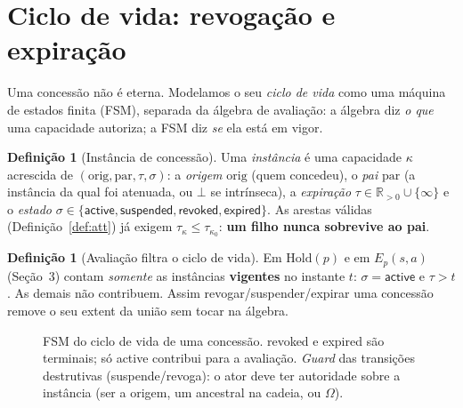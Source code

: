 \documentclass[11pt]{article}
\theoremstyle{definition}
\newtheorem{definition}[theorem]{Definição}
\begin{document}
\section{Ciclo de vida: revogação e expiração}\label{sec:lifecycle}

Uma concessão não é eterna. Modelamos o seu \emph{ciclo de vida} como uma
máquina de estados finita (FSM), separada da álgebra de avaliação: a álgebra
diz \emph{o que} uma capacidade autoriza; a FSM diz \emph{se} ela está em
vigor.

\begin{definition}[Instância de concessão]
Uma \emph{instância} é uma capacidade $\kappa$ acrescida de
$(\mathrm{orig},\mathrm{par},\tau,\sigma)$: a \emph{origem} $\mathrm{orig}$
(quem concedeu), o \emph{pai} $\mathrm{par}$ (a instância da qual foi
atenuada, ou $\bot$ se intrínseca), a \emph{expiração}
$\tau\in\mathbb{R}_{>0}\cup\{\infty\}$ e o \emph{estado}
$\sigma\in\{\textsf{active},\textsf{suspended},\textsf{revoked},
\textsf{expired}\}$. As arestas válidas (Definição~\ref{def:att}) já exigem
$\tau_\kappa\le\tau_{\kappa_0}$: \textbf{um filho nunca sobrevive ao pai}.
\end{definition}

\begin{definition}[Avaliação filtra o ciclo de vida]
Em $\mathrm{Hold}(p)$ e em $E_p(s,a)$ (Seção~3) contam \emph{somente} as
instâncias \textbf{vigentes} no instante $t$: $\sigma=\textsf{active}$ e
$\tau>t$. As demais não contribuem. Assim revogar/suspender/expirar uma
concessão remove o seu extent da união sem tocar na álgebra.
\end{definition}

  \begin{figure}[h]
  \centering
\caption{FSM do ciclo de vida de uma concessão. \textsf{revoked} e
\textsf{expired} são terminais; só \textsf{active} contribui para a
avaliação. \emph{Guard} das transições destrutivas (suspende/revoga): o ator
deve ter autoridade sobre a instância (ser a origem, um ancestral na cadeia,
ou $\Omega$).}
\label{fig:fsm}
\end{figure}
\end{document}

